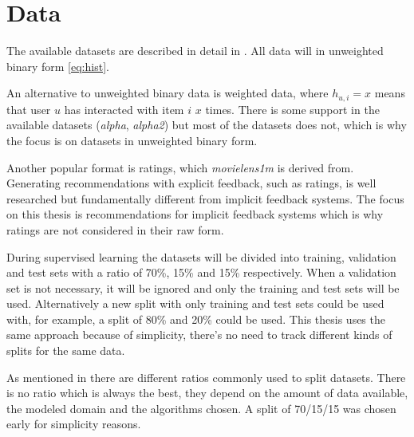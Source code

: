 
\section{Data}

The available datasets are described in detail in . All data will in unweighted binary form \eqref{eq:hist}.

An alternative to unweighted binary data is weighted data, where $h_{u, i} = x$ means that user $u$ has interacted with item $i$ $x$ times. There is some support in the available datasets (\textit{alpha}, \textit{alpha2}) but most of the datasets does not, which is why the focus is on datasets in unweighted binary form.

Another popular format is ratings, which \textit{movielens1m} is derived from. Generating recommendations with explicit feedback, such as ratings, is well researched but fundamentally different from implicit feedback systems. The focus on this thesis is recommendations for implicit feedback systems which is why ratings are not considered in their raw form.

During supervised learning the datasets will be divided into training, validation and test sets with a ratio of 70\%, 15\% and 15\% respectively. When a validation set is not necessary, it will be ignored and only the training and test sets will be used. Alternatively a new split with only training and test sets could be used with, for example, a split of 80\% and 20\% could be used. This thesis uses the same approach because of simplicity, there's no need to track different kinds of splits for the same data.

As mentioned in  there are different ratios commonly used to split datasets. There is no ratio which is always the best, they depend on the amount of data available, the modeled domain and the algorithms chosen. A split of 70/15/15 was chosen early for simplicity reasons.

